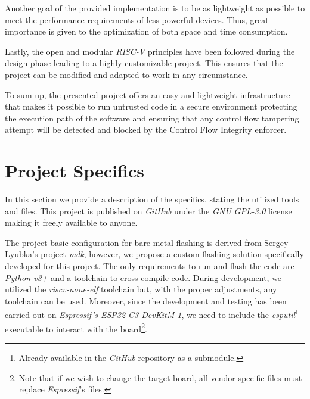 Another goal of the provided implementation is to be as lightweight as possible to
meet the performance requirements of less powerful devices. Thus, great importance
is given to the optimization of both space and time consumption.

Lastly, the open and modular \textit{RISC-V} principles have been followed during
the design phase leading to a highly customizable project. This ensures that the
project can be modified and adapted to work in any circumstance.

To sum up, the presented project offers an easy and lightweight infrastructure that
makes it possible to run untrusted code in a secure environment protecting the execution
path of the software and ensuring that any control flow tampering attempt will be
detected and blocked by the Control Flow Integrity enforcer.

\section{Project Specifics}
\label{sec:project_specifics}

In this section we provide a description of the specifics, stating the utilized tools
and files. This project is published on \textit{GitHub}\cite{repo} under the
\textit{GNU GPL-3.0} license\cite{gpl3} making it freely available to anyone.

The project basic configuration for bare-metal flashing is derived from Sergey
Lyubka's project \textit{mdk}\cite{mdk}, however, we propose a custom flashing
solution specifically developed for this project. The only requirements to run and
flash the code are \textit{Python v3+} and a toolchain to cross-compile code. During
development, we utilized the \textit{riscv-none-elf}\cite{toolchain} toolchain
but, with the proper adjustments, any toolchain can be used. Moreover, since the
development and testing has been carried out on \textit{Espressif's ESP32-C3-DevKitM-1}\cite{esp32c3},
we need to include the \textit{esputil}\footnote{Already available in the
\textit{GitHub} repository as a submodule\cite{esputil}.} executable to interact
with the board\footnote{Note that if we wish to change the target board, all vendor-specific
files must replace \textit{Espressif}'s files.}.


